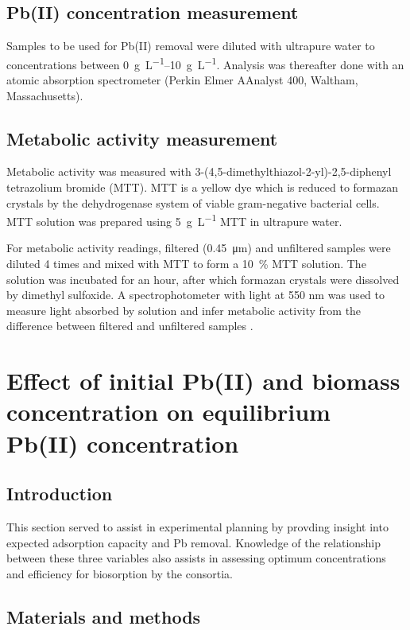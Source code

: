 \subsection{Pb(II) concentration measurement}

Samples to be used for Pb(II) removal were diluted with ultrapure water to concentrations between \SIrange[range-phrase=~and~]{0}{10}{\gram\per\liter}. Analysis was thereafter done with an atomic absorption spectrometer (Perkin Elmer AAnalyst 400, Waltham, Massachusetts).

\subsection{Metabolic activity measurement}

Metabolic activity was measured with 3-(4,5-dimethylthiazol-2-yl)-2,5-diphenyl tetrazolium bromide (MTT). MTT is a yellow dye which is reduced to formazan crystals by the dehydrogenase system of viable gram-negative bacterial cells. MTT solution was prepared using \SI{5}{\gram\per\liter} MTT in ultrapure water. 

For metabolic activity readings, filtered (\SI{0.45}{\micro\meter}) and unfiltered samples were diluted 4 times and mixed with MTT to form a \SI{10}{\percent} MTT solution. The solution was incubated for an hour, after which formazan crystals were dissolved by dimethyl sulfoxide. A spectrophotometer with light at 550 nm was used to measure light absorbed by solution and infer metabolic activity from the difference between filtered and unfiltered samples \parencite{Peens2018}. 

\newpage

\section{Effect of initial Pb(II) and biomass concentration on equilibrium Pb(II) concentration}

\subsection{Introduction}

This section served to assist in experimental planning by provding insight into expected adsorption capacity and Pb removal. Knowledge of the relationship between these three variables also assists in assessing optimum concentrations and efficiency for biosorption by the consortia.

\subsection{Materials and methods}


